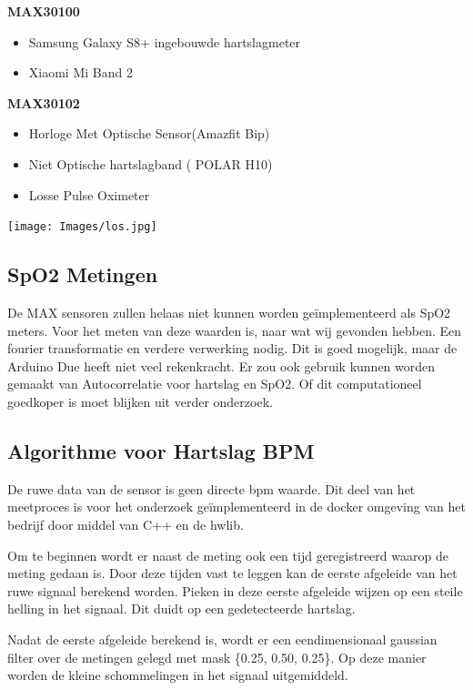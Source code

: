 \documentclass[11pt]{article}
\begin{document}
\pagebreak

\textbf{MAX30100}
\begin{itemize}
	\item Samsung Galaxy S8+ ingebouwde hartslagmeter
	\item Xiaomi Mi Band 2
\end{itemize}

\textbf{MAX30102}
\begin{itemize}
\item Horloge Met Optische Sensor(Amazfit Bip)
\item Niet Optische hartslagband ( POLAR H10)
\item Losse Pulse Oximeter
\end{itemize}

    \texttt{[image: Images/los.jpg]}

\subsection{SpO2 Metingen}

De MAX sensoren zullen helaas niet kunnen worden geïmplementeerd als SpO2 meters. Voor het meten van deze waarden is, naar wat wij gevonden hebben. Een fourier transformatie en verdere verwerking nodig. Dit is goed mogelijk, maar de Arduino Due heeft niet veel rekenkracht. Er zou ook gebruik kunnen worden gemaakt van Autocorrelatie\citep{piotrowski2010robust} voor hartslag en SpO2. Of dit computationeel goedkoper is moet blijken uit verder onderzoek. 

\subsection{Algorithme voor Hartslag BPM}
De ruwe data van de sensor is geen directe bpm waarde. Dit deel van het meetproces is voor het onderzoek geïmplementeerd in de docker omgeving van het bedrijf door middel van C++ en de hwlib. 

Om te beginnen wordt er naast de meting ook een tijd geregistreerd waarop de meting gedaan is. Door deze tijden vast te leggen kan de eerste afgeleide van het ruwe signaal berekend worden. Pieken in deze eerste afgeleide wijzen op een steile helling in het signaal. Dit duidt op een gedetecteerde hartslag.

Nadat de eerste afgeleide berekend is, wordt er een eendimensionaal gaussian filter over de metingen gelegd met mask \{0.25, 0.50, 0.25\}. Op deze manier worden de kleine schommelingen in het signaal uitgemiddeld.
\end{document}
